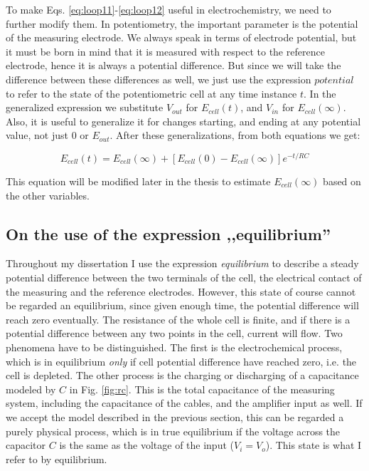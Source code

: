 To make Eqs. \ref{eq:loop11}-\ref{eq:loop12} useful in electrochemistry, we need to further modify them.
In potentiometry, the important parameter is the potential of the measuring electrode.
We always speak in terms of electrode potential, but it must be born in mind that it is measured with respect to the reference electrode, hence it is always a potential difference.
But since we will take the difference between these differences as well, we just use the expression $potential$ to refer to the state of the potentiometric cell at any time instance $t$.
In the generalized expression we substitute $V_{out}$ for $E_{cell}(t)$, and $V_{in}$ for $E_{cell}(\infty)$.
Also, it is useful to generalize it for changes starting, and ending at any potential value, not just $0$ or $E_{out}$.
After these generalizations, from both equations we get:

\begin{equation}
\label{eq:rc}
        E_{cell}(t) = E_{cell}(\infty) + [E_{cell}(0) - E_{cell}(\infty)]e^{-t/RC}
\end{equation}

This equation \cite{lindner1986definition} will be modified later in the thesis to estimate $E_{cell}(\infty)$ based on the other variables.

\subsection{On the use of the expression ,,equilibrium''}
Throughout my dissertation I use the expression \emph{equilibrium} to describe a steady potential difference between the two terminals of the cell, the electrical contact of the measuring and the reference electrodes.
However, this state of course cannot be regarded an equilibrium, since given enough time, the potential difference will reach zero eventually.
The resistance of the whole cell is finite, and if there is a potential difference between any two points in the cell, current will flow.
Two phenomena have to be distinguished.
The first is the electrochemical process, which is in equilibrium \emph{only} if cell potential difference have reached zero, i.e. the cell is depleted.
The other process is the charging or discharging of a capacitance modeled by $C$ in Fig. \ref{fig:rc}.
This is the total capacitance of the measuring system, including the capacitance of the cables, and the amplifier input as well.
If we accept the model described in the previous section, this can be regarded a purely physical process, which is in true equilibrium if the voltage across the capacitor $C$ is the same as the voltage of the input ($V_i = V_o$). This state is what I refer to by equilibrium.

